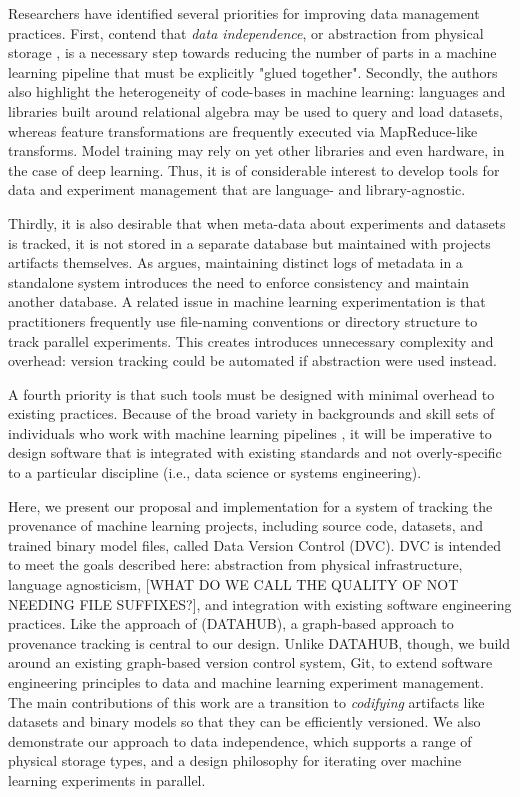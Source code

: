 \documentclass[10pt,sigconf, authordraft]{acmart}
\begin{document}
Researchers have identified several priorities for improving data management practices. First, \citet{Schelter2018OnManagement} contend that \textit{data independence}, or abstraction from physical storage \cite{Tsatalos1996TheIndependence}, is a necessary step towards reducing the number of parts in a machine learning pipeline that must be explicitly "glued together". Secondly, the authors also highlight the heterogeneity of code-bases in machine learning: languages and libraries built around relational algebra may be used to query and load datasets, whereas feature transformations are frequently executed via MapReduce-like transforms. Model training may rely on yet other libraries and even hardware, in the case of deep learning. Thus, it is of considerable interest to develop tools for data and experiment management that are language- and library-agnostic. 

Thirdly, it is also desirable that when meta-data about experiments and datasets is tracked, it is not stored in a separate database but maintained with projects artifacts themselves. As \citet{Muniswamy-Reddy2006Provenance-awareSystems} argues, maintaining distinct logs of metadata in a standalone system introduces the need to enforce consistency and maintain another database. A related issue in machine learning experimentation is that practitioners frequently use file-naming conventions or directory structure to track parallel experiments\cite{Gharibi2019AutomatedExperiments}. This creates introduces unnecessary complexity and overhead: version tracking could be automated if abstraction were used instead. 

A fourth priority is that such tools must be designed with minimal overhead to existing practices. Because of the broad variety in backgrounds and skill sets of individuals who work with machine learning pipelines \cite{Amershi2019SoftwareStudy,Halevy2016Goods:Datasets,Schelter2018OnManagement}, it will be imperative to design software that is integrated with existing standards and not overly-specific to a particular discipline (i.e., data science or systems engineering). 


Here, we present our proposal and implementation for a system of tracking the provenance of machine learning projects, including source code, datasets, and trained binary model files, called Data Version Control (DVC). DVC is intended to meet the goals described here: abstraction from physical infrastructure, language agnosticism, [WHAT DO WE CALL THE QUALITY OF NOT NEEDING FILE SUFFIXES?], and integration with existing software engineering practices. Like the approach of \citet{Bhardwaj2015DataHub:Scale} (DATAHUB), a graph-based approach to provenance tracking is central to our design. Unlike DATAHUB, though, we build around an existing graph-based version control system, Git, to extend software engineering principles to data and machine learning experiment management. The main contributions of this work are a transition to \textit{codifying} artifacts like datasets and binary models so that they can be efficiently versioned. We also demonstrate our approach to data independence, which supports a range of physical storage types, and a design philosophy for iterating over machine learning experiments in parallel. 
\end{document}

